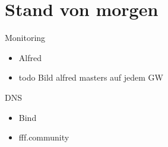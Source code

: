 \section{Stand von morgen}

\begin{frame}{Monitoring}
    \begin{itemize}
        \item Alfred
        \item todo Bild alfred masters auf jedem GW
    \end{itemize}
\end{frame}

\begin{frame}{DNS}
    \begin{itemize}
        \item Bind
        \item fff.community
    \end{itemize}
\end{frame}

